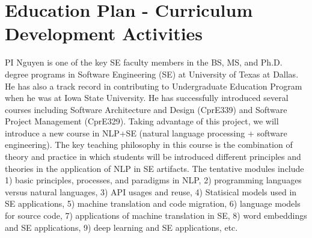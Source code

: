 \section{Education Plan - Curriculum Development Activities}
\label{edu-section}



 PI
Nguyen is one of the key SE faculty members in the BS, MS, and Ph.D.
degree programs in Software Engineering (SE) at University of Texas at
Dallas. He has also a track record in contributing to Undergraduate
Education Program when he was at Iowa State University. He has
successfully introduced several courses including Software
Architecture and Design (CprE339) and Software Project Management
(CprE329). Taking advantage of this project, we will introduce a new
course in NLP+SE (natural language processing + software
engineering). The key teaching philosophy in this course is the
combination of theory and practice in which students will be
introduced different principles and theories in the application of NLP
in SE artifacts. The tentative modules include 1) basic principles,
processes, and paradigms in NLP, 2) programming languages versus
natural languages, 3) API usages and reuse, 4) Statisical models used
in SE applications, 5) machine translation and code migration, 6)
language models for source code, 7) applications of machine
translation in SE, 8) word embeddings and SE applications, 9) deep
learning and SE applications, etc.


